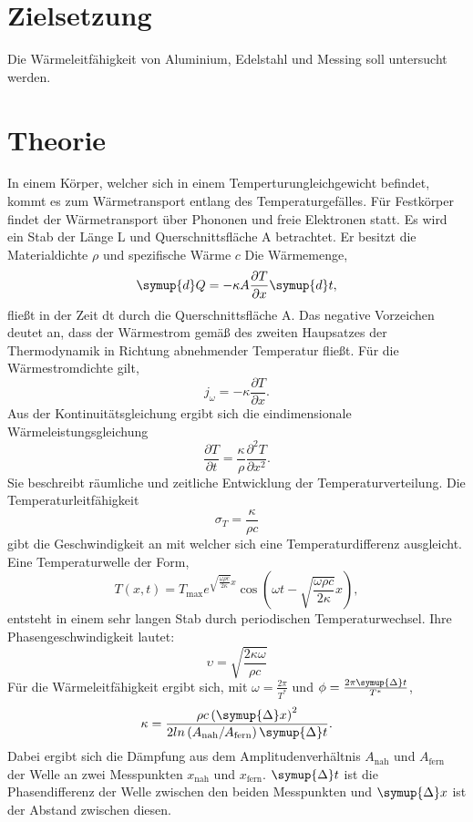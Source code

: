 \section{Zielsetzung}
Die Wärmeleitfähigkeit von Aluminium, Edelstahl und Messing soll untersucht werden.
\section{Theorie}
\label{sec:Theorie}
In einem Körper, welcher sich in einem Temperturungleichgewicht befindet, kommt es zum Wärmetransport entlang des Temperaturgefälles.
Für Festkörper findet der Wärmetransport über Phononen und freie Elektronen statt.
Es wird ein Stab der Länge L und Querschnittsfläche A betrachtet.
Er besitzt die Materialdichte $\rho$ und spezifische Wärme $c$
Die Wärmemenge,
\begin{equation}
  \label{eqn:gl1}
    \symup{d}Q =-  \kappa A \frac{\partial T}{\partial x} \symup{d}t,
\end{equation}
fließt in der Zeit dt durch die Querschnittsfläche A.
Das negative Vorzeichen deutet an, dass der Wärmestrom gemäß des zweiten Haupsatzes der
Thermodynamik in Richtung abnehmender Temperatur fließt.
Für die Wärmestromdichte gilt,
\begin{equation}
    j_\omega =- \kappa \frac{\partial T}{\partial x}.
\end{equation}
Aus der Kontinuitätsgleichung ergibt sich die eindimensionale Wärmeleistungsgleichung
\begin{equation}
    \frac{\partial T}{\partial t} = \frac {\kappa}{\rho} \frac{\partial^2  T}{\partial x^2}.
\end{equation}
Sie beschreibt räumliche und zeitliche Entwicklung der Temperaturverteilung.
Die Temperaturleitfähigkeit
\begin{equation}
    \sigma_T = \frac{\kappa}{\rho c}
\end{equation}
gibt die Geschwindigkeit an mit welcher sich eine Temperaturdifferenz ausgleicht.
%
Eine Temperaturwelle der Form,
\begin{equation}
    T\left(x,t\right) = T_\text{max}e^{\sqrt{\frac{\omega\rho c}{2 \kappa}}x} \cos\left(\omega t - \sqrt{\frac{\omega\rho c}{2 \kappa}}x\right),
\label{eqn:thermowelle}
\end{equation}
entsteht in einem sehr langen Stab durch periodischen Temperaturwechsel.
Ihre Phasengeschwindigkeit lautet:
\begin{equation}
    \upsilon = \sqrt{\frac{2\kappa\omega}{\rho c}}
\end{equation}
Für die Wärmeleitfähigkeit ergibt sich, mit  $\omega=\frac{2\pi}{T^*}$ und $\phi=\frac{2\pi\symup{\Delta}t}{T^*}$,
\begin{equation}
    \kappa = \frac{\rho c\left(\symup{\Delta}x\right)^2}{2 ln\left(A_\text{nah}/A_\text{fern}\right)\symup{\Delta}t}.
    \label{eqn:wleitfaehigkeit}
\end{equation}
Dabei ergibt sich die Dämpfung aus dem Amplitudenverhältnis $A_\text{nah}$ und $A_\text{fern}$ der Welle an zwei Messpunkten
$x_\text{nah}$ und $x_\text{fern}$.
$\symup{\Delta}t$ ist die Phasendifferenz der Welle zwischen den beiden Messpunkten und $\symup{\Delta}x$ ist der Abstand zwischen
diesen.
